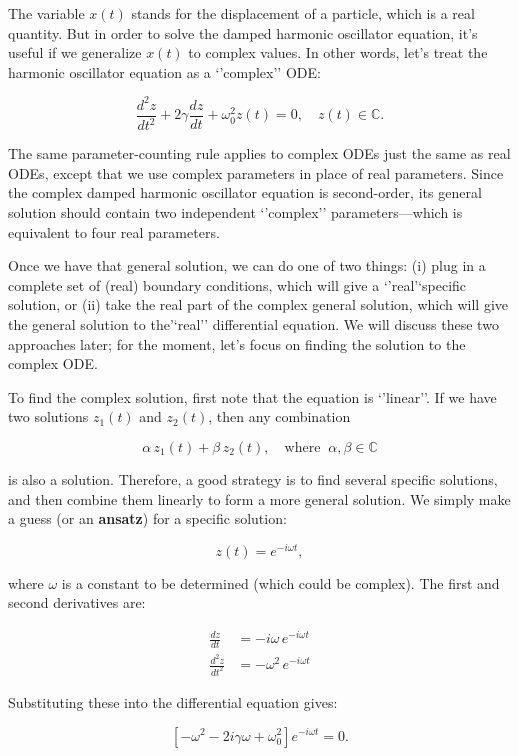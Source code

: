 \documentclass[11pt]{article}
\begin{document}
The variable \(x(t)\) stands for the displacement of a particle, which
is a real quantity. But in order to solve the damped harmonic oscillator
equation, it's useful if we generalize \(x(t)\) to complex values. In
other words, let's treat the harmonic oscillator equation as a
`'complex'' ODE:

\[\frac{d^2 z}{dt^2} + 2\gamma \frac{dz}{dt} + \omega_0^2 z(t) = 0, \quad z(t) \in \mathbb{C}.\]

The same parameter-counting rule applies to complex ODEs just the same
as real ODEs, except that we use complex parameters in place of real
parameters. Since the complex damped harmonic oscillator equation is
second-order, its general solution should contain two independent
`'complex'' parameters---which is equivalent to four real parameters.

Once we have that general solution, we can do one of two things: (i)
plug in a complete set of (real) boundary conditions, which will give a
`'real'`specific solution, or (ii) take the real part of the complex
general solution, which will give the general solution to the'`real''
differential equation. We will discuss these two approaches later; for
the moment, let's focus on finding the solution to the complex ODE.

To find the complex solution, first note that the equation is
`'linear''. If we have two solutions \(z_1(t)\) and \(z_2(t)\), then any
combination

\[\alpha \, z_1(t) + \beta \,z_2(t),\quad \mathrm{where}\;\; \alpha, \beta \in \mathbb{C}\]

is also a solution. Therefore, a good strategy is to find several
specific solutions, and then combine them linearly to form a more
general solution. We simply make a guess (or an \textbf{ansatz}) for a
specific solution:

\[z(t) = e^{-i\omega t},\]

where \(\omega\) is a constant to be determined (which could be
complex). The first and second derivatives are:

\[\begin{align}\frac{dz}{dt} &= -i\omega\, e^{-i\omega t} \\ \frac{d^2z}{dt^2} &= -\omega^2\, e^{-i\omega t}\end{align}\]

Substituting these into the differential equation gives:

\[\left[-\omega^2 - 2i\gamma \omega + \omega_0^2 \right] e^{-i\omega t} = 0.\]
\end{document}
